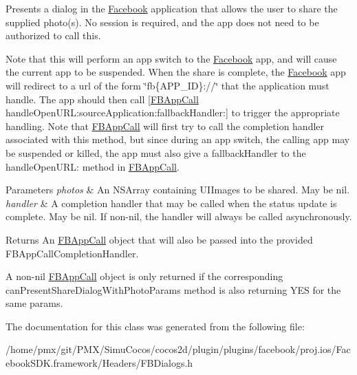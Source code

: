 Presents a dialog in the \hyperlink{interfaceFacebook}{Facebook} application that allows the user to share the supplied photo(s). No session is required, and the app does not need to be authorized to call this.

Note that this will perform an app switch to the \hyperlink{interfaceFacebook}{Facebook} app, and will cause the current app to be suspended. When the share is complete, the \hyperlink{interfaceFacebook}{Facebook} app will redirect to a url of the form \char`\"{}fb\{\+A\+P\+P\+\_\+\+I\+D\}\+://\char`\"{} that the application must handle. The app should then call \mbox{[}\hyperlink{interfaceFBAppCall}{F\+B\+App\+Call} handle\+Open\+U\+R\+L\+:source\+Application\+:fallback\+Handler\+:\mbox{]} to trigger the appropriate handling. Note that \hyperlink{interfaceFBAppCall}{F\+B\+App\+Call} will first try to call the completion handler associated with this method, but since during an app switch, the calling app may be suspended or killed, the app must also give a fallback\+Handler to the handle\+Open\+U\+RL\+: method in \hyperlink{interfaceFBAppCall}{F\+B\+App\+Call}.


\begin{DoxyParams}{Parameters}
{\em photos} & An N\+S\+Array containing U\+I\+Images to be shared. May be nil.\\
\hline
{\em handler} & A completion handler that may be called when the status update is complete. May be nil. If non-\/nil, the handler will always be called asynchronously.\\
\hline
\end{DoxyParams}
\begin{DoxyReturn}{Returns}
An \hyperlink{interfaceFBAppCall}{F\+B\+App\+Call} object that will also be passed into the provided F\+B\+App\+Call\+Completion\+Handler.
\end{DoxyReturn}
A non-\/nil \hyperlink{interfaceFBAppCall}{F\+B\+App\+Call} object is only returned if the corresponding can\+Present\+Share\+Dialog\+With\+Photo\+Params method is also returning Y\+ES for the same params. 

The documentation for this class was generated from the following file\+:\begin{DoxyCompactItemize}
\item 
/home/pmx/git/\+P\+M\+X/\+Simu\+Cocos/cocos2d/plugin/plugins/facebook/proj.\+ios/\+Facebook\+S\+D\+K.\+framework/\+Headers/F\+B\+Dialogs.\+h\end{DoxyCompactItemize}
